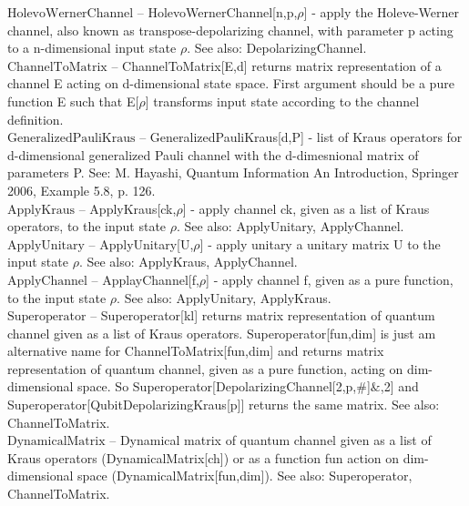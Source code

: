 \noindent\textbf{$ \text{HolevoWernerChannel} $ }-- HolevoWernerChannel[n,p,$\rho $] - apply the Holeve-Werner channel, also known as transpose-depolarizing channel, with parameter p acting to a n-dimensional input state $\rho $. See also: DepolarizingChannel.$  $\\[6pt]

\noindent\textbf{$ \text{ChannelToMatrix} $ }-- ChannelToMatrix[E,d] returns matrix representation of a channel E acting on d-dimensional state space. First argument should be a pure function E such that E[$\rho $] transforms input state according to the channel definition.$  $\\[6pt]

\noindent\textbf{$ \text{GeneralizedPauliKraus} $ }-- GeneralizedPauliKraus[d,P] - list of Kraus operators for d-dimensional generalized Pauli channel with the d-dimesnional matrix of parameters P. See: M. Hayashi, Quantum Information An Introduction, Springer 2006, Example 5.8, p. 126.$  $\\[6pt]

\noindent\textbf{$ \text{ApplyKraus} $ }-- ApplyKraus[ck,$\rho $] - apply channel ck, given as a list of Kraus operators, to the input state $\rho $. See also: ApplyUnitary, ApplyChannel.$  $\\[6pt]

\noindent\textbf{$ \text{ApplyUnitary} $ }-- ApplyUnitary[U,$\rho $] - apply unitary a unitary matrix U to the input state $\rho $. See also: ApplyKraus, ApplyChannel.$  $\\[6pt]

\noindent\textbf{$ \text{ApplyChannel} $ }-- ApplayChannel[f,$\rho $] - apply channel f, given as a pure function, to the input state $\rho $. See also: ApplyUnitary, ApplyKraus.$  $\\[6pt]

\noindent\textbf{$ \text{Superoperator} $ }-- Superoperator[kl] returns matrix representation of quantum channel given as a list of Kraus operators. Superoperator[fun,dim] is just am alternative name for ChannelToMatrix[fun,dim] and returns matrix representation of quantum channel, given as a pure function, acting on dim-dimensional space. So Superoperator[DepolarizingChannel[2,p,$\#$]$\&$,2] and Superoperator[QubitDepolarizingKraus[p]] returns the same matrix. See also: ChannelToMatrix.$  $\\[6pt]

\noindent\textbf{$ \text{DynamicalMatrix} $ }-- Dynamical matrix of quantum channel given as a list of Kraus operators (DynamicalMatrix[ch]) or as a function fun action on dim-dimensional space (DynamicalMatrix[fun,dim]). See also: Superoperator, ChannelToMatrix.$  $\\[6pt]

